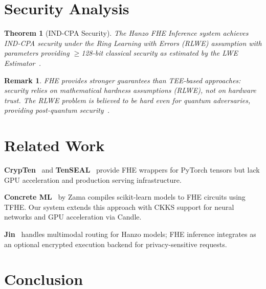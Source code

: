 \documentclass[11pt]{article}
\newtheorem{theorem}{Theorem}
\newtheorem{remark}{Remark}
\begin{document}
\section{Security Analysis}
\label{sec:security}

\begin{theorem}[IND-CPA Security]
The Hanzo FHE Inference system achieves IND-CPA security under the Ring
Learning with Errors (RLWE) assumption with parameters providing $\geq$128-bit
classical security as estimated by the LWE Estimator~\cite{lweestimator}.
\end{theorem}

\begin{remark}
FHE provides stronger guarantees than TEE-based approaches: security relies on
mathematical hardness assumptions (RLWE), not on hardware trust. The RLWE
problem is believed to be hard even for quantum adversaries, providing
post-quantum security~\cite{hanzopq}.
\end{remark}

\section{Related Work}
\label{sec:related}

\textbf{CrypTen}~\cite{crypten} and \textbf{TenSEAL}~\cite{tenseal} provide
FHE wrappers for PyTorch tensors but lack GPU acceleration and production
serving infrastructure.

\textbf{Concrete ML}~\cite{concreteml} by Zama compiles scikit-learn models to
FHE circuits using TFHE. Our system extends this approach with CKKS support for
neural networks and GPU acceleration via Candle.

\textbf{Jin}~\cite{hanzojin} handles multimodal routing for Hanzo models; FHE
inference integrates as an optional encrypted execution backend for
privacy-sensitive requests.

\section{Conclusion}
\label{sec:conclusion}
\end{document}
